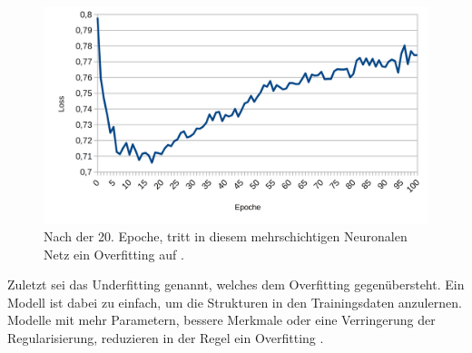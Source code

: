 \documentclass[11pt,bibliography=totocnumbered]{scrartcl}
\begin{document}
\begin{figure}[H] 
	\centering
	\includegraphics[width=1.0\textwidth]{mlp_5_loss}
	\caption[Overfitting in einem mehrschichtigen Neuronalen Netz]{Nach der 20. Epoche, tritt in diesem mehrschichtigen Neuronalen Netz ein Overfitting auf \cite[S.14]{BA}.}
	\label{fig:mlp_overfitting}
\end{figure}
Zuletzt sei das Underfitting genannt, welches dem Overfitting gegenübersteht. Ein Modell ist dabei zu einfach, um die Strukturen in den Trainingsdaten anzulernen. Modelle mit mehr Parametern, bessere Merkmale oder eine Verringerung der Regularisierung, reduzieren in der Regel ein Overfitting \cite[S.29]{MACHINE_LEARNING}\cite[S.14]{BA}.
\end{document}

